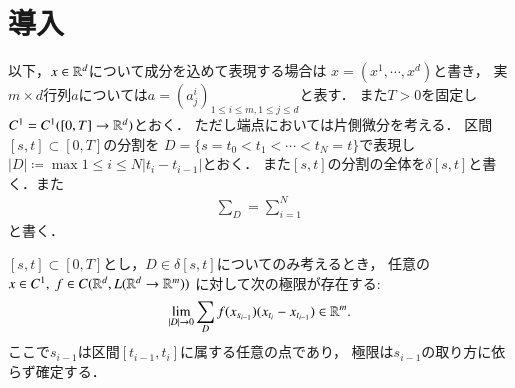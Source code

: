 \section{導入}
	以下，$x \in \mathbb{R}^d$について成分を込めて表現する場合は
	$x = (x^1,\cdots,x^d)$と書き，
	実$m \times d$行列$a$については$a=(a^i_j)_{1 \leq i \leq m,1 \leq j \leq d}$と表す．
	また$T > 0$を固定し$C^1 = C^1([0,T] \rightarrow \mathbb{R}^d)$とおく．
	ただし端点においては片側微分を考える．
	区間$[s,t] \subset [0,T]$の分割を
	$D = \{s = t_0 < t_1 < \cdots < t_N = t\}$で表現し
	$|D| \coloneqq \max{1 \leq i \leq N}{\left| t_i - t_{i-1} \right|}$とおく．
	また$[s,t]$の分割の全体を$\delta[s,t]$と書く．また
	\begin{align}
		\sum_D = \sum_{i=1}^{N}
	\end{align}
	と書く．

	\begin{screen}
		\begin{thm}\label{thm:existence_of_Riemann_Stieltjes_integral}
			$[s,t] \subset [0,T]$とし，$D \in \delta[s,t]$についてのみ考えるとき，
			任意の$x \in C^1,\ f \in C(\mathbb{R}^d,L(\mathbb{R}^d \rightarrow \mathbb{R}^m))$
			に対して次の極限が存在する:\footnotemark
			\begin{align}
				\lim_{|D| \to 0}
				\sum_{D} f(x_{s_{i-1}})(x_{t_i} - x_{t_{i-1}})
				\in \mathbb{R}^m.
			\end{align}
			ここで$s_{i-1}$は区間$[t_{i-1},t_i]$に属する任意の点であり，
			極限は$s_{i-1}$の取り方に依らず確定する．
		\end{thm}
	\end{screen}
